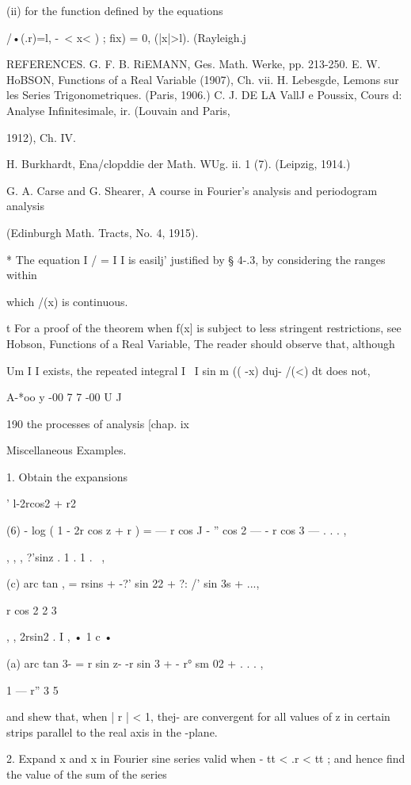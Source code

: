 {(ii) for the function defined by the equations

/•(.r)=l, -\ < x< ) ; fix) = 0, (|x|>l). (Rayleigh.j

REFERENCES. G. F. B. RiEMANN, Ges. Math. Werke, pp. 213-250. E. W.
HoBSON, Functions of a Real Variable (1907), Ch. vii. H. Lebesgde,
Lemons sur les Series Trigonometriques. (Paris, 1906.) C. J. DE LA
VallJ e Poussix, Cours d: Analyse Infinitesimale, ir. (Louvain and
Paris,

1912), Ch. IV.

H. Burkhardt, Ena/clopddie der Math. WUg. ii. 1 (7). (Leipzig, 1914.)

G. A. Carse and G. Shearer, A course in Fourier's analysis and
periodogram analysis

(Edinburgh Math. Tracts, No. 4, 1915).

* The equation I / = I I is easilj' justified by § 4-.3, by
considering the ranges within

which /(x) is continuous.

t For a proof of the theorem when f(x] is subject to less stringent
restrictions, see Hobson, Functions of a Real Variable, %
The reader should observe that, although

Um I I exists, the repeated integral I \ I sin m (( -x) duj- /(<) dt
does not,

A-*oo y -00 7 7 -00 U J



190 the processes of analysis [chap. ix

Miscellaneous Examples.

1. Obtain the expansions

  ' l-2rcos2 + r2

(6) - log ( 1 - 2r cos z + r ) = — r cos J - '' cos 2 — - r cos 3 — .
. . ,

, , , ?'sinz . 1 . 1 . \ ,

(c) arc tan , = rsins + -?' sin 22 + ?: /' sin 3s + ...,

   r cos 2 2 3

, , 2rsin2 . I , • 1 c •

(a) arc tan 3- = r sin z- -r sin 3 + - r° sm 02 + . . . ,

1 — r'' 3 5

and shew that, when | r | < 1, thej- are convergent for all values of
z in certain strips parallel to the real axis in the -plane.

2. Expand x and x in Fourier sine series valid when - tt < .r < tt ;
and hence find the value of the sum of the series

}
